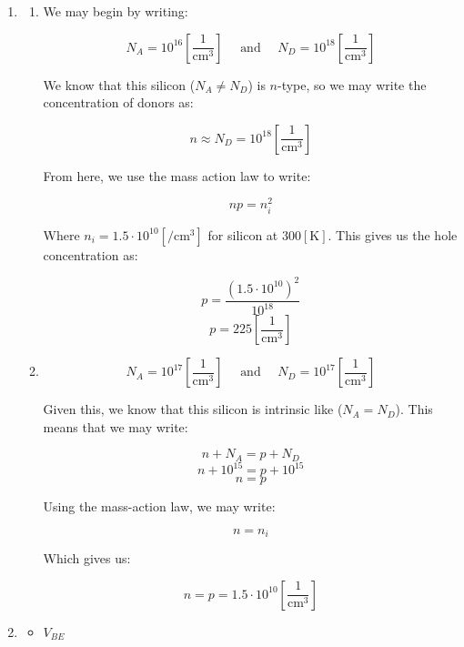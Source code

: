 \begin{enumerate}

  \item 

    \begin{enumerate}

      \item We may begin by writing:

        $$N_A=10^{16}\left[ \frac{1}{\si{\centi\meter\cubed}} \right]\quad\text{ and }\quad N_D=10^{18}\left[ \frac{1}{\si{\centi\meter\cubed}} \right]$$

        We know that this silicon ($N_A\neq N_D$) is $n$-type, so we may write the concentration of donors as:

        $$\boxed{n\approx N_D=10^{18}\left[ \frac{1}{\si{\centi\meter\cubed}} \right]}$$

        From here, we use the mass action law to write:

        $$np=n_i^2$$

        Where $n_i=1.5\cdot10^{10}[\si{\per\centi\meter\cubed}]$ for silicon at $300[\si{\kelvin}]$. This gives us the hole concentration as:

        $$p=\frac{(1.5\cdot10^{10})^2}{10^{18}}$$
        $$\boxed{p=225[\frac{1}{\si{\centi\meter\cubed}}]}$$

      \item 

        $$N_A=10^{17}\left[ \frac{1}{\si{\centi\meter\cubed}} \right]\quad\text{ and }\quad N_D=10^{17}\left[ \frac{1}{\si{\centi\meter\cubed}} \right]$$

        Given this, we know that this silicon is intrinsic like ($N_A=N_D$). This means that we may write:

        $$n+N_A=p+N_D$$
        $$n+10^{15}=p+10^{15}$$
        $$n=p$$

        Using the mass-action law, we may write:

        $$n=n_i$$

        Which gives us:

          $$\boxed{n=p=1.5\cdot10^{10}\left[ \frac{1}{\si{\centi\meter\cubed}} \right]}$$

    \end{enumerate}

  \item

    \begin{itemize}

      \item $V_{BE}$


\end{itemize}
\end{enumerate}
